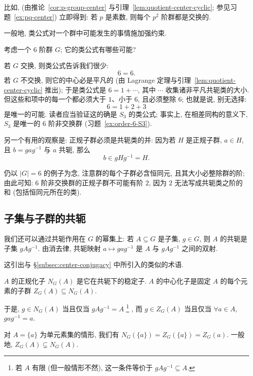 比如, (由推论~\ref{cor:p-group-center} 与引理~\ref{lem:quotient-center-cyclic}; 参见习题~\ref{ex:pq-center}) 立即得到: 若 $p$ 是素数, 则每个 $p^2$ 阶群都是交换的.

一般地, 类公式对一个群中可能发生的事情施加强约束.

\begin{example}
\label{ex:order-6}
考虑一个 $6$ 阶群 $G$; 它的类公式有哪些可能?

若 $G$ 交换, 则类公式告诉我们很少:
\[
6 = 6.
\]
若 $G$ 不交换, 则它的中心必是平凡的 (由 Lagrange 定理与引理~\ref{lem:quotient-center-cyclic} 推出); 于是类公式是 $6 = 1 + \cdots$, 其中 $\cdots$ 收集诸非平凡共轭类的大小. 但这些和项中的每一个都必须大于 $1$、小于 $6$, 且必须整除 $6$; 也就是说, 别无选择:
\[
6 = 1 + 2 + 3
\]
是唯一的可能. 读者应当验证这的确是 $S_3$ 的类公式; 事实上, 在相差同构的意义下, $S_3$ 是唯一的 $6$ 阶非交换群 (习题~\ref{ex:order-6-S3}).
\end{example}

另一个有用的观察是: 正规子群必须是共轭类的并: 因为若 $H$ 是正规子群, $a \in H$, 且 $b = gag^{-1}$ 与 $a$ 共轭, 那么
\[
b \in gHg^{-1} = H.
\]

仍以 $|G| = 6$ 的例子为念, 注意群的每个子群必含恒同元, 且其大小必整除群的阶; 由此可知: $6$ 阶非交换群的正规子群不可能有阶 $2$, 因为 $2$ 无法写成共轭类之阶的和 (包括恒同元所在的类).

\subsection{子集与子群的共轭}
\label{subsec:conjugation-subsets}

我们还可以通过共轭作用在 $G$ 的幂集上: 若 $A \subseteq G$ 是子集, $g \in G$, 则 $A$ 的共轭是子集 $gAg^{-1}$. 由消去律, 共轭映射 $a \mapsto gag^{-1}$ 是 $A$ 与 $gAg^{-1}$ 之间的双射.

这引出与 \S\ref{subsec:center-conjugacy} 中所引入的类似的术语.

\begin{definition}
\label{def:normalizer}
$A$ 的正规化子 $N_G(A)$ 是它在共轭下的稳定子. $A$ 的中心化子是固定 $A$ 的每个元素的子群 $Z_G(A) \subseteq N_G(A)$.
\end{definition}

于是, $g \in N_G(A)$ 当且仅当 $gAg^{-1} = A$%
\footnote{若 $A$ 有限 (但一般情形不然), 这一条件等价于 $gAg^{-1} \subseteq A$.}%
, 而 $g \in Z_G(A)$ 当且仅当 $\forall a \in A$, $gag^{-1} = a$.

对 $A = \{a\}$ 为单元素集的情形, 我们有 $N_G(\{a\}) = Z_G(\{a\}) = Z_G(a)$. 一般地, $Z_G(A) \subsetneq N_G(A)$.

